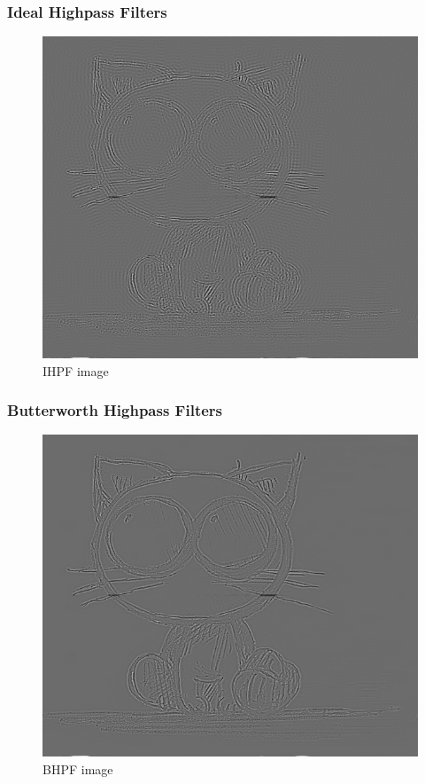 \documentclass[notheorems, serif, table, compress]{beamer}  %
\begin{document}
\begin{frame}
\frametitle{Ideal Highpass Filters}
\begin{figure}
 \centering
 \caption{IHPF image}
 \includegraphics[width=0.8\linewidth]{ihpf.png} 
 \end{figure}
 \end{frame}

\begin{frame}
\frametitle{Butterworth Highpass Filters}
\begin{figure}
 \centering
 \caption{BHPF image}
 \includegraphics[width=0.8\linewidth]{bhpf.png} 
 \end{figure}
 \end{frame}
\end{document}
